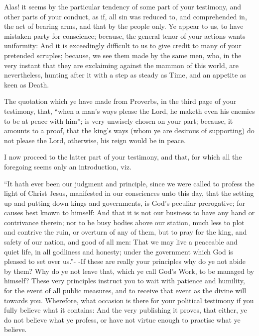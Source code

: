 \documentclass[12pt,oneside]{memoir}
\begin{document}
Alas! it seems by the particular tendency of some part of your testimony, and other parts of your conduct, as if, all sin was reduced to, and comprehended in, the act of bearing arms, and that by the people only. Ye appear to us, to have mistaken party for conscience; because, the general tenor of your actions wants uniformity: And it is exceedingly difficult to us to give credit to many of your pretended scruples; because, we see them made by the same men, who, in the very instant that they are exclaiming against the mammon of this world, are nevertheless, hunting after it with a step as steady as Time, and an appetite as keen as Death.

The quotation which ye have made from Proverbs, in the third page of your testimony, that, ``when a man's ways please the Lord, he maketh even his enemies to be at peace with him''; is very unwisely chosen on your part; because, it amounts to a proof, that the king's ways (whom ye are desirous of supporting) do not please the Lord, otherwise, his reign would be in peace.

I now proceed to the latter part of your testimony, and that, for which all the foregoing seems only an introduction, viz.

``It hath ever been our judgment and principle, since we were called to profess the light of Christ Jesus, manifested in our consciences unto this day, that the setting up and putting down kings and governments, is God's peculiar prerogative; for causes best known to himself: And that it is not our business to have any hand or contrivance therein; nor to be busy bodies above our station, much less to plot and contrive the ruin, or overturn of any of them, but to pray for the king, and safety of our nation, and good of all men: That we may live a peaceable and quiet life, in all godliness and honesty; under the government which God is pleased to set over us.''- -If these are really your principles why do ye not abide by them? Why do ye not leave that, which ye call God's Work, to be managed by himself? These very principles instruct you to wait with patience and humility, for the event of all public measures, and to receive that event as the divine will towards you. Wherefore, what occasion is there for your political testimony if you fully believe what it contains: And the very publishing it proves, that either, ye do not believe what ye profess, or have not virtue enough to practise what ye believe.
\end{document}

